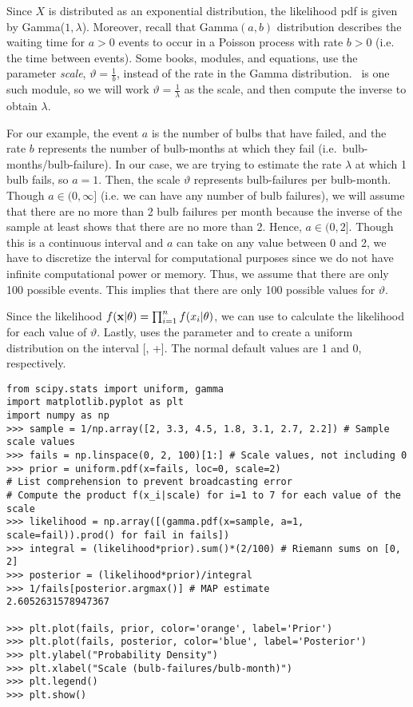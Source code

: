 Since $X$ is distributed as an exponential distribution, the likelihood pdf is given by Gamma($1,\lambda$).
Moreover, recall that Gamma$(a,b)$ distribution describes the waiting time for $a>0$ events to occur in a Poisson process with rate $b>0$ (i.e. the time between events).
Some books, modules, and equations, use the parameter \emph{scale}, $\vartheta=\frac{1}{b}$, instead of the rate in the Gamma distribution.\
 is one such module, so we will work $\vartheta=\frac{1}{\lambda}$ as the scale, and then compute the inverse to obtain $\lambda$.

For our example, the event $a$ is the number of bulbs that have failed, and the rate $b$ represents the number of bulb-months at which they fail (i.e.\ bulb-months/bulb-failure).
In our case, we are trying to estimate the rate $\lambda$ at which 1 bulb fails, so $a=1$.
Then, the scale $\vartheta$ represents bulb-failures per bulb-month.
Though $a \in(0,\infty]$ (i.e. we can have any number of bulb failures), we will assume that there are no more than 2 bulb failures per month because the inverse of the sample at least shows that there are no more than 2.
Hence, $a \in(0,2]$.
Though this is a continuous interval and $a$ can take on any value between 0 and 2, we have to discretize the interval for computational purposes since we do not have infinite computational power or memory.
Thus, we assume that there are only 100 possible events.
This implies that there are only 100 possible values for $\vartheta$.

Since the likelihood $f(\mathbf{x}| \theta)=\prod_{i=1}^{n}f(x_i| \theta)$, we can use  to calculate the likelihood for each value of $\vartheta$.
Lastly, \li{scipy.stats.uniform} uses the parameter \li{loc} and  to create a uniform distribution on the interval [\li{loc}, \li{loc}+\li{scale}].
The normal default values are 1 and 0, respectively.

\begin{lstlisting}
from scipy.stats import uniform, gamma
import matplotlib.pyplot as plt
import numpy as np
>>> sample = 1/np.array([2, 3.3, 4.5, 1.8, 3.1, 2.7, 2.2]) # Sample scale values
>>> fails = np.linspace(0, 2, 100)[1:] # Scale values, not including 0
>>> prior = uniform.pdf(x=fails, loc=0, scale=2)
# List comprehension to prevent broadcasting error
# Compute the product f(x_i|scale) for i=1 to 7 for each value of the scale
>>> likelihood = np.array([(gamma.pdf(x=sample, a=1, scale=fail)).prod() for fail in fails])
>>> integral = (likelihood*prior).sum()*(2/100) # Riemann sums on [0, 2]
>>> posterior = (likelihood*prior)/integral
>>> 1/fails[posterior.argmax()] # MAP estimate
2.6052631578947367

>>> plt.plot(fails, prior, color='orange', label='Prior')
>>> plt.plot(fails, posterior, color='blue', label='Posterior')
>>> plt.ylabel("Probability Density")
>>> plt.xlabel("Scale (bulb-failures/bulb-month)")
>>> plt.legend()
>>> plt.show()
\end{lstlisting}

